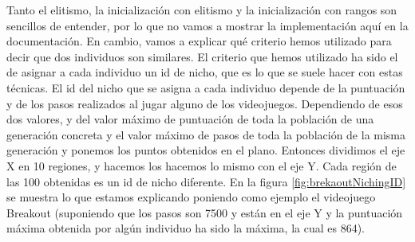 Tanto el elitismo, la inicialización con elitismo y la inicialización con rangos son sencillos de entender, por lo que no vamos a mostrar la implementación aquí en la documentación. En cambio, vamos a explicar qué criterio hemos utilizado para decir que dos individuos son similares. El criterio que hemos utilizado ha sido el de asignar a cada individuo un id de nicho, que es lo que se suele hacer con estas técnicas. El id del nicho que se asigna a cada individuo depende de la puntuación y de los pasos realizados al jugar alguno de los videojuegos. Dependiendo de esos dos valores, y del valor máximo de puntuación de toda la población de una generación concreta y el valor máximo de pasos de toda la población de la misma generación y ponemos los puntos obtenidos en el plano. Entonces dividimos el eje X en 10 regiones, y hacemos los hacemos lo mismo con el eje Y. Cada región de las 100 obtenidas es un id de nicho diferente. En la figura \ref{fig:brekaoutNichingID} se muestra lo que estamos explicando poniendo como ejemplo el videojuego Breakout (suponiendo que los pasos son 7500 y están en el eje Y y la puntuación máxima obtenida por algún individuo ha sido la máxima, la cual es 864).

